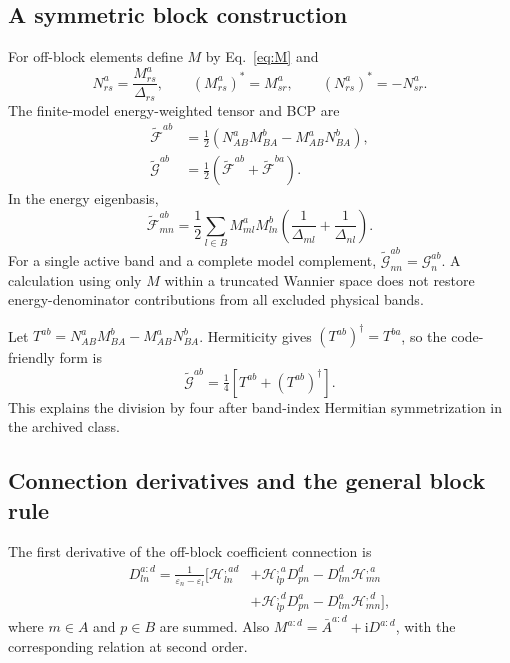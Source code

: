 \documentclass[prx,amsmath,amssymb,superscriptaddress,longbibliography]{revtex4-2}
\newcommand{\ii}{\mathrm{i}}
\newcommand{\code}[1]{\texttt{\detokenize{#1}}}
\begin{document}
\subsection{A symmetric block construction}
For off-block elements define $M$ by Eq.~\eqref{eq:M} and
\begin{equation}
 N_{rs}^a=\frac{M_{rs}^a}{\Delta_{rs}},\qquad
 (M_{rs}^a)^*=M_{sr}^a,\qquad (N_{rs}^a)^*=-N_{sr}^a.
 \label{eq:N}
\end{equation}
The finite-model energy-weighted tensor and BCP are
\begin{align}
 \widetilde{\mathcal F}^{ab}
 &=\tfrac12(N_{AB}^a M_{BA}^b-M_{AB}^a N_{BA}^b),\label{eq:weightedF}\\
 \widetilde{\mathcal G}^{ab}
 &=\tfrac12(\widetilde{\mathcal F}^{ab}+\widetilde{\mathcal F}^{ba}).
 \label{eq:bcp-block}
\end{align}
In the energy eigenbasis,
\begin{equation}
 \widetilde{\mathcal F}_{mn}^{ab}
 =\frac12\sum_{l\in B}M_{ml}^a M_{ln}^b
 \left(\frac1{\Delta_{ml}}+\frac1{\Delta_{nl}}\right).
 \label{eq:weightedF-components}
\end{equation}
For a single active band and a complete model complement,
$\widetilde{\mathcal G}_{nn}^{ab}=\mathcal G_n^{ab}$.
A calculation using only $M$ within a truncated Wannier space does not restore
energy-denominator contributions from all excluded physical bands.

Let $T^{ab}=N_{AB}^aM_{BA}^b-M_{AB}^aN_{BA}^b$.
Hermiticity gives $(T^{ab})^\dagger=T^{ba}$, so the code-friendly form is
\begin{equation}
 \widetilde{\mathcal G}^{ab}=\tfrac14[T^{ab}+(T^{ab})^\dagger].
 \label{eq:bcp-code}
\end{equation}
This explains the division by four after band-index Hermitian symmetrization
in the archived \code{BCP} class.

\subsection{Connection derivatives and the general block rule}
The first derivative of the off-block coefficient connection is
\begin{align}
 D_{ln}^{a:d}=\frac{1}{\varepsilon_n-\varepsilon_l}
 \big[\mathcal H_{ln}^{,ad}
 &+\mathcal H_{lp}^{,a}D_{pn}^d-D_{lm}^d\mathcal H_{mn}^{,a}
 \nonumber\\[-2pt]
 &+\mathcal H_{lp}^{,d}D_{pn}^a-D_{lm}^a\mathcal H_{mn}^{,d}\big],
 \label{eq:Dfirst}
\end{align}
where $m\in A$ and $p\in B$ are summed.
Also $M^{a:d}=\bar A^{a:d}+\ii D^{a:d}$, with the corresponding relation at second order.
\end{document}
